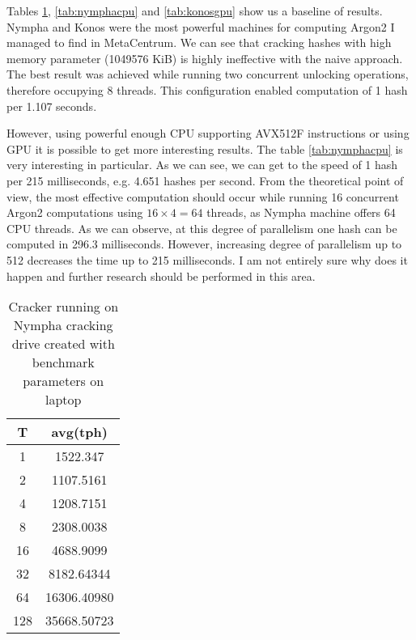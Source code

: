 \documentclass[nolof]{fithesis3}
\begin{document}
Tables \ref{tab:nymphacracker}, \ref{tab:nymphacpu}  and \ref{tab:konosgpu} show us a baseline of results. Nympha and Konos were the most powerful machines for computing Argon2 I managed to find in MetaCentrum. We can see that cracking hashes with high memory parameter (1049576 KiB) is highly ineffective with the naive approach. The best result was achieved while running two concurrent unlocking operations, therefore occupying 8 threads. This configuration enabled computation of 1 hash per 1.107 seconds.

However, using powerful enough CPU supporting AVX512F instructions or using GPU it is possible to get more interesting results. The table \ref{tab:nymphacpu} is very interesting in particular. As we can see, we can get to the speed of 1 hash per 215 milliseconds, e.g. 4.651 hashes per second. From the theoretical point of view, the most effective computation should occur while running 16 concurrent Argon2 computations using $16 \times 4 = 64$ threads, as Nympha machine offers 64 CPU threads. As we can observe, at this degree of parallelism one hash can be computed in 296.3 milliseconds. However, increasing degree of parallelism up to 512 decreases the time up to 215 milliseconds. I am not entirely sure why does it happen and further research should be performed in this area.




\noindent
\begin{table}
\caption{Cracker running on Nympha cracking drive created with benchmark parameters on laptop}
\label{tab:nymphacracker}
\begin{tabularx}{\textwidth}{| c | c |}
\hline
T & avg(tph)\\
\hline
1 & 1522.347\\
\hline
2 & 1107.5161\\
\hline
4 & 1208.7151\\
\hline
8 & 2308.0038\\
\hline
16 & 4688.9099\\
\hline
32 & 8182.64344\\
\hline
64 & 16306.40980\\
\hline
128 & 35668.50723\\
\hline
\end{tabularx}
\end{table}
\end{document}
